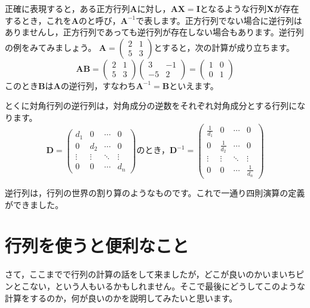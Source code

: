 \documentclass{ltjsbook}
\begin{document}
正確に表現すると，ある正方行列$\bm{A}$に対し，$\bm{A}\bm{X}=\bm{I}$となるような行列$\bm{X}$が存在するとき，これを$\bm{A}$のと呼び，$\bm{A}^{-1}$で表します。正方行列でない場合に逆行列はありませんし，正方行列であっても逆行列が存在しない場合もあります。逆行列の例をみてみましょう。
$\bm{A}=\begin{pmatrix}2&1\\5&3\end{pmatrix}$とすると，次の計算が成り立ちます。
\begin{equation*}
    \bm{AB}=\begin{pmatrix}2&1\\5&3\end{pmatrix}\begin{pmatrix}3&-1\\-5&2\end{pmatrix}=\begin{pmatrix}1&0\\0&1\end{pmatrix}
\end{equation*}
このとき$\bm{B}$は$\bm{A}$の逆行列，すなわち$\bm{A}^{-1}=\bm{B}$といえます。

とくに対角行列の逆行列は，対角成分の逆数をそれぞれ対角成分とする行列になります。
\begin{equation*}
    \bm{D} = \begin{pmatrix} d_1    & 0      & \cdots & 0      \\
                0      & d_2    & \cdots & 0      \\
                \vdots & \vdots & \ddots & \vdots \\
                0      & 0      & \cdots & d_n\end{pmatrix}
    \mbox{のとき，}
    \bm{D}^{-1} = \begin{pmatrix} \frac{1}{d_1} & 0             & \cdots & 0             \\
                0             & \frac{1}{d_2} & \cdots & 0             \\
                \vdots        & \vdots        & \ddots & \vdots        \\
                0             & 0             & \cdots & \frac{1}{d_n}\end{pmatrix}
\end{equation*}

逆行列は，行列の世界の割り算のようなものです。これで一通り四則演算の定義ができました。

\section{行列を使うと便利なこと}
\label{MatrixAndEauqtion}
さて，ここまでで行列の計算の話をして来ましたが，どこが良いのかいまいちピンとこない，という人もいるかもしれません。そこで最後にどうしてこのような計算をするのか，何が良いのかを説明してみたいと思います。
\end{document}
